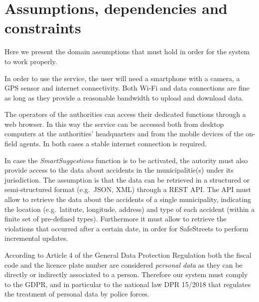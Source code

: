 \section{Assumptions, dependencies and constraints}

Here we present the domain assumptions that must hold in order for the system
to work properly.
\begin{description}
\end{description}

In order to use the service, the user will need a smartphone with a camera,
a GPS sensor and internet connectivity. Both Wi-Fi and data connections are fine
as long as they provide a reasonable bandwidth to upload and download data.

The operators of the authorities can access their dedicated functions through
a web browser. In this way the service can be accessed both from desktop
computers at the authorities' headquarters and from the mobile devices of the
on-field agents. In both cases a stable internet connection is required.

In case the \emph{SmartSuggestions} function is to be activated, the autority
must also provide access to the data about accidents in the municipalitie(s)
under its jurisdiction.
The assumption is that the data can be retrieved in a structured or
semi-structured format (e.g.\ JSON, XML) through a REST API.
The API must allow to retrieve the data about the accidents of a single
municipality, indicating the location (e.g.\ latitute, longitude, address) and
type of each accident (within a finite set of pre-defined types).
Furthermore it must allow to retrieve the violations that occurred after a
certain date, in order for SafeStreets to perform incremental updates.

According to Article 4 of the General Data Protection Regulation
\cite{gdpr:article-4-definitions} both the fiscal code and the licence plate
nunber are considered \emph{personal data} as they can be directly or indirectly
associated to a person. Therefore our system must comply to the GDPR, and in
particular to the national law DPR 15/2018 \cite{gu:dpr-15/2018} that regulates
the treatment of personal data by police forces.